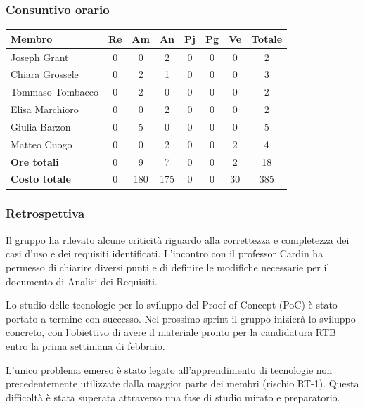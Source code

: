 \documentclass[11pt,a4paper]{article}
\begin{document}
\subsubsection{Consuntivo orario}
\begin{center}
    \begin{tabular}{|l|c|c|c|c|c|c|c|}
        \hline
        \textbf{Membro} & \textbf{Re} & \textbf{Am} & \textbf{An} & \textbf{Pj} & \textbf{Pg} & \textbf{Ve} & \textbf{Totale} \\
        \hline
        Joseph Grant & 0 & 0 & 2 & 0 & 0 & 0 & 2 \\
        \hline
        Chiara Grossele & 0 & 2 & 1 & 0 & 0 & 0 & 3 \\
        \hline
        Tommaso Tombacco & 0 & 2 & 0 & 0 & 0 & 0 & 2 \\
        \hline
        Elisa Marchioro & 0 & 0 & 2 & 0 & 0 & 0 & 2 \\
        \hline
        Giulia Barzon & 0 & 5 & 0 & 0 & 0 & 0 & 5 \\
        \hline
        Matteo Cuogo & 0 & 0 & 2 & 0 & 0 & 2 & 4 \\
        \hline
        \textbf{Ore totali} & 0 & 9 & 7 & 0 & 0 & 2 & 18 \\
        \hline
        \textbf{Costo totale} & 0 & 180 & 175 & 0 & 0 & 30 & 385 \\
        \hline
    \end{tabular}
\end{center}

\subsubsection{Retrospettiva}
Il gruppo ha rilevato alcune criticità riguardo alla correttezza e completezza dei casi d’uso e dei requisiti identificati. L’incontro con il professor Cardin ha permesso di chiarire diversi punti e di definire le modifiche necessarie per il documento di Analisi dei Requisiti.

Lo studio delle tecnologie per lo sviluppo del Proof of Concept (PoC) è stato portato a termine con successo. Nel prossimo sprint il gruppo inizierà lo sviluppo concreto, con l’obiettivo di avere il materiale pronto per la candidatura RTB entro la prima settimana di febbraio.

L’unico problema emerso è stato legato all’apprendimento di tecnologie non precedentemente utilizzate dalla maggior parte dei membri (rischio RT-1). Questa difficoltà è stata superata attraverso una fase di studio mirato e preparatorio.
\end{document}
